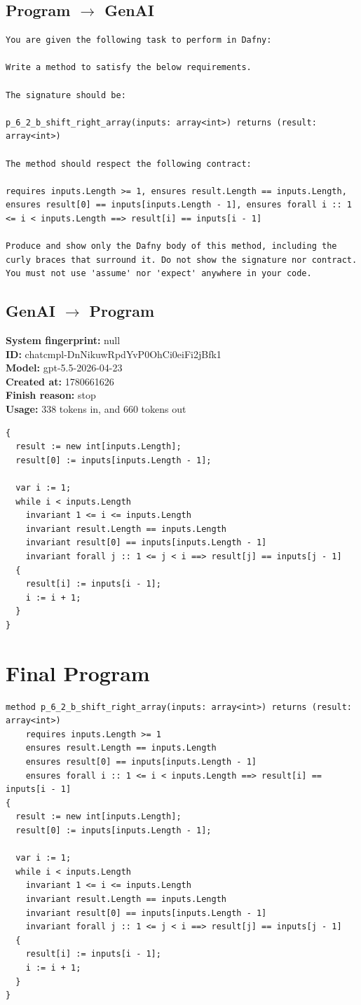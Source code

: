\documentclass{article}
\begin{document}
\subsection*{Program $\rightarrow$ GenAI}
\begin{lstlisting}
You are given the following task to perform in Dafny:

Write a method to satisfy the below requirements.

The signature should be:

p_6_2_b_shift_right_array(inputs: array<int>) returns (result: array<int>)

The method should respect the following contract:

requires inputs.Length >= 1, ensures result.Length == inputs.Length, ensures result[0] == inputs[inputs.Length - 1], ensures forall i :: 1 <= i < inputs.Length ==> result[i] == inputs[i - 1]

Produce and show only the Dafny body of this method, including the curly braces that surround it. Do not show the signature nor contract. You must not use 'assume' nor 'expect' anywhere in your code.
\end{lstlisting}
\subsection*{GenAI $\rightarrow$ Program}
\textbf{System fingerprint: }null
\\\textbf{ID: }chatcmpl-DnNikuwRpdYvP0OhCi0eiFi2jBfk1
\\\textbf{Model: }gpt-5.5-2026-04-23
\\\textbf{Created at: }1780661626
\\\textbf{Finish reason: }stop
\\\textbf{Usage: }338 tokens in, and 660 tokens out
\begin{lstlisting}
{
  result := new int[inputs.Length];
  result[0] := inputs[inputs.Length - 1];

  var i := 1;
  while i < inputs.Length
    invariant 1 <= i <= inputs.Length
    invariant result.Length == inputs.Length
    invariant result[0] == inputs[inputs.Length - 1]
    invariant forall j :: 1 <= j < i ==> result[j] == inputs[j - 1]
  {
    result[i] := inputs[i - 1];
    i := i + 1;
  }
}
\end{lstlisting}
\section*{Final Program}
\begin{lstlisting}
method p_6_2_b_shift_right_array(inputs: array<int>) returns (result: array<int>)
	requires inputs.Length >= 1
	ensures result.Length == inputs.Length
	ensures result[0] == inputs[inputs.Length - 1]
	ensures forall i :: 1 <= i < inputs.Length ==> result[i] == inputs[i - 1]
{
  result := new int[inputs.Length];
  result[0] := inputs[inputs.Length - 1];

  var i := 1;
  while i < inputs.Length
    invariant 1 <= i <= inputs.Length
    invariant result.Length == inputs.Length
    invariant result[0] == inputs[inputs.Length - 1]
    invariant forall j :: 1 <= j < i ==> result[j] == inputs[j - 1]
  {
    result[i] := inputs[i - 1];
    i := i + 1;
  }
}
\end{lstlisting}
\end{document}
